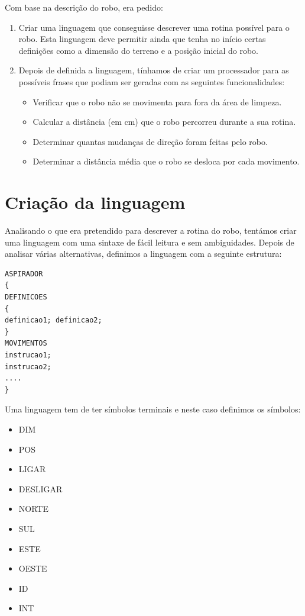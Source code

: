 \documentclass[a4paper]{article}
\begin{document}
Com base na descrição do robo, era pedido:
\begin{enumerate}
\item Criar uma linguagem que conseguisse descrever uma rotina possível para o robo. Esta linguagem deve permitir ainda que tenha no início certas definições como a dimensão do terreno e a posição inicial do robo.
\item Depois de definida a linguagem, tínhamos de criar um processador para as possíveis frases que podiam ser geradas com as seguintes funcionalidades:
\begin{itemize}
\item Verificar que o robo não se movimenta para fora da área de limpeza.
\item Calcular a distância (em cm) que o robo percorreu durante a sua rotina.
\item Determinar quantas mudanças de direção foram feitas pelo robo.
\item Determinar a distância média que o robo se desloca por cada movimento.
\end{itemize}
\end{enumerate}
 
 
\section{Criação da linguagem}
Analisando o que era pretendido para descrever a rotina do robo, tentámos criar uma linguagem com uma sintaxe de fácil leitura e sem ambiguidades. Depois de analisar várias alternativas, definimos a linguagem com a seguinte estrutura:
\begin{lstlisting}[style=gramatica]
ASPIRADOR
{
DEFINICOES
{
definicao1; definicao2;
}
MOVIMENTOS
instrucao1;
instrucao2;
....
}
\end{lstlisting}
 
Uma linguagem tem de ter símbolos terminais e neste caso definimos os símbolos:
\begin{itemize}
\item DIM
\item POS
\item LIGAR
\item DESLIGAR
\item NORTE
\item SUL
\item ESTE
\item OESTE
\item ID
\item INT
\end{itemize}
 
\end{document}
